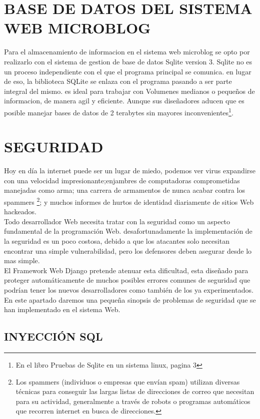 \section{BASE DE DATOS DEL SISTEMA WEB MICROBLOG}
Para el almacenamiento de informacion en el sistema web microblog se opto por realizarlo con el sistema de gestion de base de datos Sqlite version 3.
Sqlite no es un proceso independiente con el que el programa principal se comunica. en lugar de eso, la biblioteca SQLite se enlaza con el programa
pasando a ser parte integral del mismo.
es ideal para trabajar con Volumenes medianos o pequeños de informacion, de manera agil y eficiente. Aunque sus diseñadores aducen que es posible manejar bases de datos
de 2 terabytes sin mayores inconvenientes\footnote{En el libro Pruebas de Sqlite en un sistema linux, pagina 3}.

\section{SEGURIDAD}

Hoy en día la internet puede ser un lugar de miedo, podemos ver virus expandirse con una velocidad impresionante;enjambres de computadoras comprometidas manejadas como arma; una carrera de armamentos de nunca acabar contra los spammers \footnote{Los spammers (individuos o empresas que envían spam) utilizan diversas técnicas para conseguir las largas listas de direcciones de correo que necesitan para su actividad, generalmente a través de robots o programas automáticos que recorren internet en busca de direcciones.}; y muchos informes de hurtos de identidad diariamente de sitios Web hackeados.\\
Todo desarrollador Web necesita tratar con la seguridad como un aspecto fundamental de la programación Web.
desafortunadamente la implementación de la seguridad es un poco costosa, debido a que los atacantes solo necesitan encontrar una simple vulnerabilidad, pero los defensores deben asegurar desde lo mas simple.\\
El Framework Web Django pretende atenuar esta dificultad, esta diseñado para proteger automáticamente de muchos posibles errores comunes de seguridad que podrían tener los nuevos desarrolladores como también de los ya experimentados.
En este apartado daremos una pequeña sinopsis de problemas de seguridad que se han implementado en el sistema Web.

\subsection{INYECCIÓN SQL}

